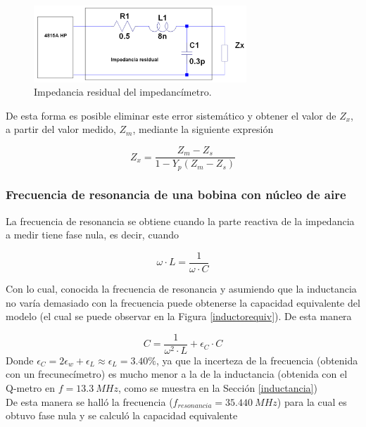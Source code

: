 \documentclass[a4paper,10pt]{article}
\begin{document}
		\begin{figure}[!htb]
			\centering
			\includegraphics[width=8cm]
			{Imagenes/impedanciares.png}
			\caption{Impedancia residual del impedanc\'imetro.}
			\label{impres} 
		\end{figure}
		
		\indent De esta forma es posible eliminar este error sistem\'atico y 
		obtener el valor de $Z_x$, a partir del valor medido, $Z_m$, mediante la
		siguiente expresi\'on
		
		$$Z_x=\frac{Z_m-Z_s}{1-Y_p(Z_m-Z_s)}$$
		
		\subsubsection{Frecuencia de resonancia de una bobina con n\'ucleo de 
		aire}
		
		\indent La frecuencia de resonancia se obtiene cuando la parte reactiva 
		de la impedancia a medir tiene fase nula, es decir, cuando
		
		$$\omega\cdot L=\frac{1}{\omega \cdot C}$$
		
		\indent Con lo cual, conocida la frecuencia de resonancia y asumiendo 
		que la inductancia no var\'ia demasiado con la frecuencia puede 
		obtenerse la capacidad equivalente del modelo (el cual se puede observar
		en la Figura \ref{inductorequiv}). De esta manera
		
		$$C=\frac{1}{\omega^2 \cdot L}+\epsilon_C \cdot C$$
		\indent Donde $\epsilon_C=2\epsilon_w+\epsilon_L\approx \epsilon_L =
		3.40\%$, ya que la incerteza de la frecuencia (obtenida con un 
		frecunec\'imetro) es mucho menor a la de la inductancia (obtenida con el
		Q-metro en $f=13.3~MHz$, como se muestra en la Secci\'on \ref{inductancia}) \\
		\indent De esta manera se hall\'o la frecuencia ($f_{resonancia}=
		35.440~MHz$) para la cual es obtuvo fase nula y se calcul\'o la 
		capacidad equivalente
		
\end{document}
